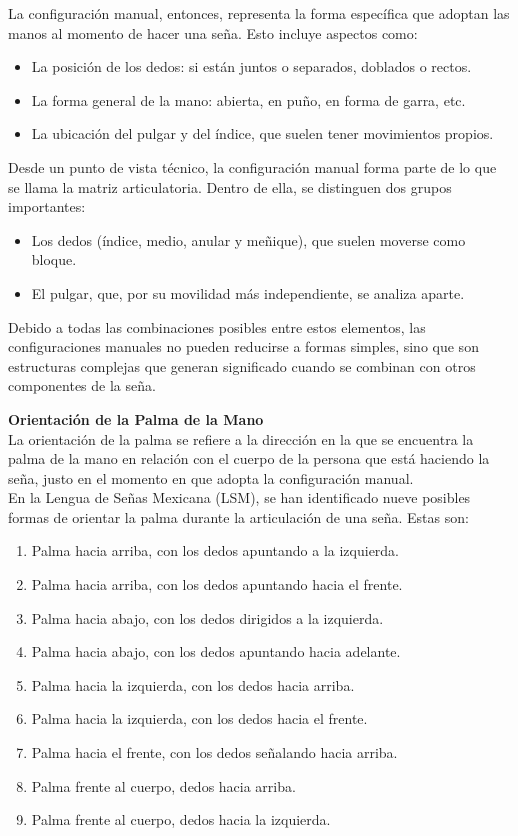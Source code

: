 La configuración manual, entonces, representa la forma específica que adoptan las manos al momento de hacer una seña. Esto incluye aspectos como:

\begin{itemize}
    \item La posición de los dedos: si están juntos o separados, doblados o rectos.
    \item La forma general de la mano: abierta, en puño, en forma de garra, etc.
    \item La ubicación del pulgar y del índice, que suelen tener movimientos propios.
\end{itemize}

Desde un punto de vista técnico, la configuración manual forma parte de lo que se llama la matriz articulatoria. Dentro de ella, se distinguen dos grupos importantes:

\begin{itemize}
    \item Los dedos (índice, medio, anular y meñique), que suelen moverse como bloque.
    \item El pulgar, que, por su movilidad más independiente, se analiza aparte.
\end{itemize}

Debido a todas las combinaciones posibles entre estos elementos, las configuraciones manuales no pueden reducirse a formas simples, sino que son estructuras complejas que generan significado cuando se combinan con otros componentes de la seña.

\newpage

\textbf{Orientación de la Palma de la Mano}\\
La orientación de la palma se refiere a la dirección en la que se encuentra la palma de la mano en relación con el cuerpo de la persona que está haciendo la seña, justo en el momento en que adopta la configuración manual.\\

En la Lengua de Señas Mexicana (LSM), se han identificado nueve posibles formas de orientar la palma durante la articulación de una seña. Estas son:

\begin{enumerate}
    \item Palma hacia arriba, con los dedos apuntando a la izquierda.
    \item Palma hacia arriba, con los dedos apuntando hacia el frente.
    \item Palma hacia abajo, con los dedos dirigidos a la izquierda.
    \item Palma hacia abajo, con los dedos apuntando hacia adelante.
    \item Palma hacia la izquierda, con los dedos hacia arriba.
    \item Palma hacia la izquierda, con los dedos hacia el frente.
    \item Palma hacia el frente, con los dedos señalando hacia arriba.
    \item Palma frente al cuerpo, dedos hacia arriba.
    \item Palma frente al cuerpo, dedos hacia la izquierda.
\end{enumerate}

